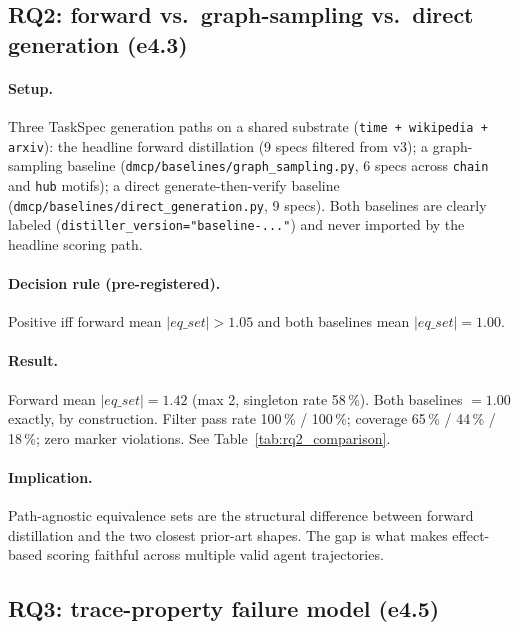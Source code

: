 \subsection{RQ2: forward vs.\ graph-sampling vs.\ direct generation (e4.3)}
\label{sec:rq2}

\paragraph{Setup.} Three TaskSpec generation paths on a shared
substrate (\texttt{time + wikipedia + arxiv}): the headline forward
distillation (9 specs filtered from v3); a graph-sampling baseline
(\texttt{dmcp/baselines/graph\_sampling.py}, 6 specs across
\texttt{chain} and \texttt{hub} motifs); a direct generate-then-verify
baseline (\texttt{dmcp/baselines/direct\_generation.py}, 9 specs). Both
baselines are clearly labeled (\texttt{distiller\_version="baseline-..."})
and never imported by the headline scoring path.

\paragraph{Decision rule (pre-registered).} Positive iff forward
mean $|eq\_set| > 1.05$ and both baselines mean $|eq\_set| = 1.00$.

\paragraph{Result.} Forward mean $|eq\_set| = \mathbf{1.42}$ (max 2,
singleton rate 58\,\%). Both baselines $= 1.00$ exactly, by
construction. Filter pass rate 100\,\% / 100\,\%; coverage 65\,\% /
44\,\% / 18\,\%; zero marker violations. See
Table~\ref{tab:rq2_comparison}.



\paragraph{Implication.} Path-agnostic equivalence sets are the
structural difference between forward distillation and the two closest
prior-art shapes. The gap is what makes effect-based scoring faithful
across multiple valid agent trajectories.

\subsection{RQ3: trace-property failure model (e4.5)}
\label{sec:rq3}

